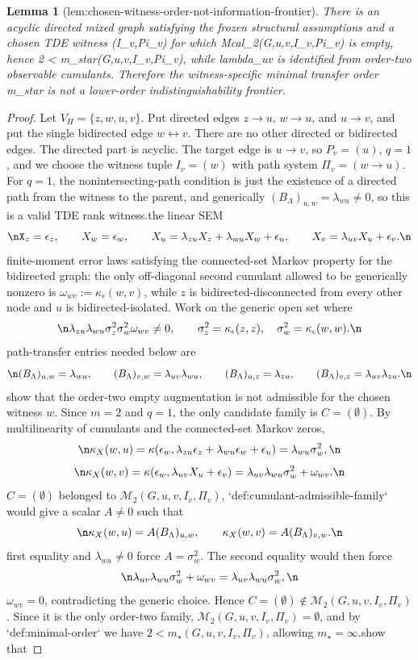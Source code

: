 \documentclass{article}
\newtheorem{lemma}{Lemma}
\begin{document}
\begin{lemma}[lem:chosen-witness-order-not-information-frontier]\label{lem:chosen-witness-order-not-information-frontier}
There is an acyclic directed mixed graph satisfying the frozen structural assumptions and a chosen TDE witness (I_v,Pi_v) for which Mcal_2(G,u,v,I_v,Pi_v) is empty, hence 2 < m_star(G,u,v,I_v,Pi_v), while lambda_uv is identified from order-two observable cumulants. Therefore the witness-specific minimal transfer order m_star is not a lower-order indistinguishability frontier.
\end{lemma}
\begin{proof}
Let \(V_H=\{z,w,u,v\}\). Put directed edges \(z\to u\), \(w\to u\), and \(u\to v\), and put the single bidirected edge \(w\leftrightarrow v\). There are no other directed or bidirected edges. The directed part is acyclic. The target edge is \(u\to v\), so \(P_v=(u)\), \(q=1\), and we choose the witness tuple \(I_v=(w)\) with path system \(\Pi_v=(w\to u)\). For \(q=1\), the nonintersecting-path condition is just the existence of a directed path from the witness to the parent, and generically \((B_\Lambda)_{u,w}=\lambda_{wu}\ne 0\), so this is a valid TDE rank witness.\n\nTake the linear SEM\n\[\nX_z=\epsilon_z,\qquad X_w=\epsilon_w,\qquad X_u=\lambda_{zu}X_z+\lambda_{wu}X_w+\epsilon_u,\qquad X_v=\lambda_{uv}X_u+\epsilon_v.\n\]\nChoose finite-moment error laws satisfying the connected-set Markov property for the bidirected graph: the only off-diagonal second cumulant allowed to be generically nonzero is \(\omega_{wv}:=\kappa_\epsilon(w,v)\), while \(z\) is bidirected-disconnected from every other node and \(u\) is bidirected-isolated. Work on the generic open set where\n\[\n\lambda_{zu}\lambda_{wu}\sigma_z^2\sigma_w^2\omega_{wv}\ne 0,\qquad\sigma_z^2=\kappa_\epsilon(z,z),\quad \sigma_w^2=\kappa_\epsilon(w,w).\n\]\nThe path-transfer entries needed below are\n\[\n(B_\Lambda)_{u,w}=\lambda_{wu},\qquad (B_\Lambda)_{v,w}=\lambda_{uv}\lambda_{wu},\qquad (B_\Lambda)_{u,z}=\lambda_{zu},\qquad (B_\Lambda)_{v,z}=\lambda_{uv}\lambda_{zu}.\n\]\n\nFirst show that the order-two empty augmentation is not admissible for the chosen witness \(w\). Since \(m=2\) and \(q=1\), the only candidate family is \(C=(\emptyset)\). By multilinearity of cumulants and the connected-set Markov zeros,\n\[\n\kappa_X(w,u)=\kappa(\epsilon_w,\lambda_{zu}\epsilon_z+\lambda_{wu}\epsilon_w+\epsilon_u)=\lambda_{wu}\sigma_w^2,\n\]\nand\n\[\n\kappa_X(w,v)=\kappa(\epsilon_w,\lambda_{uv}X_u+\epsilon_v)=\lambda_{uv}\lambda_{wu}\sigma_w^2+\omega_{wv}.\n\]\nIf \(C=(\emptyset)\) belonged to \(\mathcal M_2(G,u,v,I_v,\Pi_v)\), `def:cumulant-admissible-family` would give a scalar \(A\ne0\) such that\n\[\n\kappa_X(w,u)=A(B_\Lambda)_{u,w},\qquad \kappa_X(w,v)=A(B_\Lambda)_{v,w}.\n\]\nThe first equality and \(\lambda_{wu}\ne0\) force \(A=\sigma_w^2\). The second equality would then force\n\[\n\lambda_{uv}\lambda_{wu}\sigma_w^2+\omega_{wv}=\lambda_{uv}\lambda_{wu}\sigma_w^2,\n\]\nso \(\omega_{wv}=0\), contradicting the generic choice. Hence \(C=(\emptyset)\notin\mathcal M_2(G,u,v,I_v,\Pi_v)\). Since it is the only order-two family, \(\mathcal M_2(G,u,v,I_v,\Pi_v)=\emptyset\), and by `def:minimal-order` we have \(2<m_\star(G,u,v,I_v,\Pi_v)\), allowing \(m_\star=\infty\).\n\nNow show that 
\end{proof}
\end{document}
